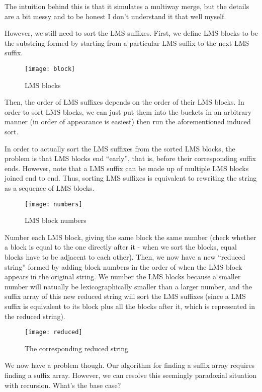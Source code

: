 \documentclass[11pt, oneside]{article}
\begin{document}
The intuition behind this is that it simulates a multiway merge, but the details are a bit messy and to be honest I don't understand it that well myself.

However, we still need to sort the LMS suffixes. First, we define LMS blocks to be
the substring formed by starting from a particular LMS suffix to the next LMS suffix.

\begin{figure}[h!]
\centering
\texttt{[image: block]}
\caption{LMS blocks}
\end{figure}

Then, the order of LMS suffixes depends on the order of their LMS blocks.
In order to sort LMS blocks, we can just put them into the buckets in an arbitrary manner (in order of appearance is easiest) then run the aforementioned induced sort.

In order to actually sort the LMS suffixes from the sorted LMS blocks, the problem is that LMS blocks end ``early'',
that is, before their corresponding suffix ends. However, note that a LMS suffix can be made up of multiple LMS blocks joined end to end.
Thus, sorting LMS suffixes is equivalent to rewriting the string as a sequence of LMS blocks.

\begin{figure}[h!]
\centering
\texttt{[image: numbers]}
\caption{LMS block numbers}
\end{figure}

Number each LMS block, giving the same block the same number
(check whether a block is equal to the one directly after it - when we sort the blocks, equal blocks have to be adjacent to each other).
Then, we now have a new ``reduced string'' formed by adding block numbers in the order of when the LMS block appears in the original string.
We number the LMS blocks because a smaller number will natually be lexicographically smaller than a larger number,
and the suffix array of this new reduced string will sort the LMS suffixes
(since a LMS suffix is equivalent to its block plus all the blocks after it, which is represented in the reduced string).

\begin{figure}[h!]
\centering
\texttt{[image: reduced]}
\caption{The corresponding reduced string}
\end{figure}

We now have a problem though.
Our algorithm for finding a suffix array requires finding a suffix array.
However, we can resolve this seemingly paradoxial situation with recursion.
What's the base case?
\end{document}
